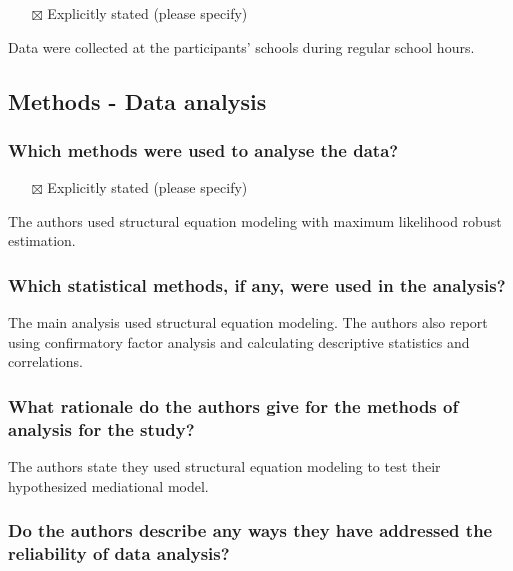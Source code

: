 \documentclass[
  doc, a4paper]{apa7}
\providecommand{\tightlist}{%
  \setlength{\itemsep}{0pt}\setlength{\parskip}{0pt}}
\begin{document}
\begin{itemize}
\tightlist
\item[$\boxtimes$]
  Explicitly stated (please specify)
\end{itemize}

Data were collected at the participants' schools during regular school hours.

\subsection{Methods - Data analysis}\label{methods---data-analysis}

\subsubsection{Which methods were used to analyse the data?}\label{which-methods-were-used-to-analyse-the-data}

\begin{itemize}
\tightlist
\item[$\boxtimes$]
  Explicitly stated (please specify)
\end{itemize}

The authors used structural equation modeling with maximum likelihood robust estimation.

\subsubsection{Which statistical methods, if any, were used in the analysis?}\label{which-statistical-methods-if-any-were-used-in-the-analysis}

The main analysis used structural equation modeling. The authors also report using confirmatory factor analysis and calculating descriptive statistics and correlations.

\subsubsection{What rationale do the authors give for the methods of analysis for the study?}\label{what-rationale-do-the-authors-give-for-the-methods-of-analysis-for-the-study}

The authors state they used structural equation modeling to test their hypothesized mediational model.

\subsubsection{Do the authors describe any ways they have addressed the reliability of data analysis?}\label{do-the-authors-describe-any-ways-they-have-addressed-the-reliability-of-data-analysis}
\end{document}
